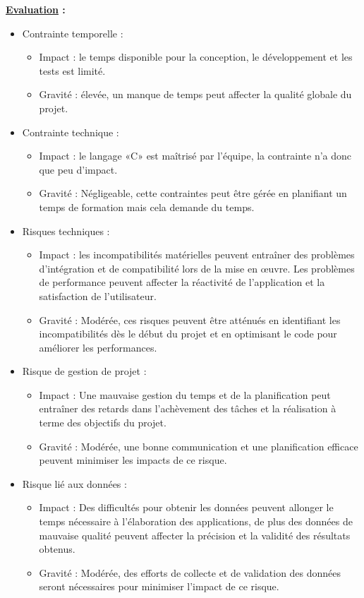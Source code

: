 \documentclass[a4paper, 12pt]{report}
\begin{document}
\textbf{\underline{Evaluation} :}
\begin{itemize}
    \item Contrainte temporelle :
          \begin{itemize}
              \item Impact : le temps disponible pour la conception, le développement et les tests est limité.
              \item Gravité : élevée, un manque de temps peut affecter la qualité globale du projet.
          \end{itemize}
    \item Contrainte technique :
          \begin{itemize}
              \item Impact : le langage «C» est maîtrisé par l'équipe, la contrainte n'a donc que peu d'impact.
              \item Gravité : Négligeable, cette contraintes peut être gérée en planifiant un temps de formation mais cela demande du temps.
          \end{itemize}
          \clearpage %

    \item Risques techniques :
          \begin{itemize}
              \item Impact : les incompatibilités matérielles peuvent entraîner des problèmes d'intégration et de compatibilité lors de la mise en œuvre. Les problèmes de performance peuvent affecter la réactivité de l'application et la satisfaction de l'utilisateur.
              \item Gravité : Modérée, ces risques peuvent être atténués en identifiant les incompatibilités dès le début du projet et en optimisant le code pour améliorer les performances.
          \end{itemize}
    \item Risque de gestion de projet :
          \begin{itemize}
              \item Impact : Une mauvaise gestion du temps et de la planification peut entraîner des retards dans l'achèvement des tâches et la réalisation à terme des objectifs du projet.
              \item Gravité : Modérée, une bonne communication et une planification efficace peuvent minimiser les impacts de ce risque.
          \end{itemize}
    \item Risque lié aux données :
          \begin{itemize}
              \item Impact : Des difficultés pour obtenir les données peuvent allonger le temps nécessaire à l'élaboration des applications, de plus des données de mauvaise qualité peuvent affecter la précision et la validité des résultats obtenus.
              \item Gravité : Modérée, des efforts de collecte et de validation des données seront nécessaires pour minimiser l'impact de ce risque.
          \end{itemize}
\end{itemize}
\end{document}
